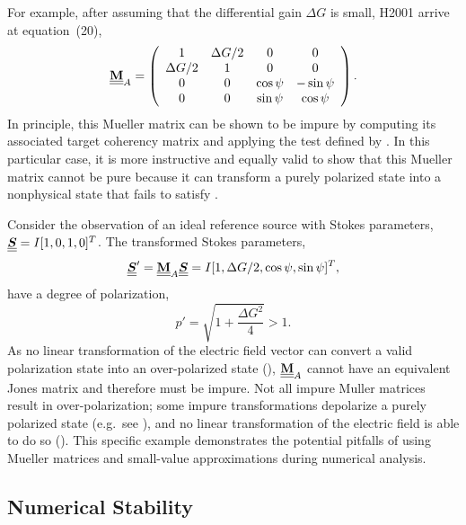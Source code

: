 For example, after assuming that the differential gain $\Delta G$ is small,
H2001 arrive at equation~(20),
\begin{equation}
\label{eqn:hpn+01_eqn20}
{\underline{\underline{{\bf M}}}}_A=\left( \begin{array}{cccc}
1 & \Delta G/2 & 0 & 0 \\
\Delta G/2 & 1 & 0 & 0 \\
0 & 0 & \cos\psi & -\sin\psi \\
0 & 0 & \sin\psi & \cos\psi
\end{array} \right).
\end{equation}
%
In principle, this Mueller matrix can be shown to be impure
by computing its associated target coherency matrix and applying
the test defined by .
%
In this particular case, it is more instructive and equally valid to show that this Mueller matrix cannot be pure because it can transform a purely polarized state into a nonphysical state that fails to satisfy .

Consider the observation of an ideal reference source  with Stokes parameters,
$\underline{\underline{\mbox{\boldmath $S$}}}=I[1,0,1,0]^T$.
%
The transformed Stokes parameters,
\begin{equation}
\underline{\underline{\mbox{\boldmath $S$}}}'={\underline{\underline{{\bf M}}}}_A \underline{\underline{\mbox{\boldmath $S$}}} = I[1,\Delta G/2,\cos\psi,\sin\psi]^T,
\end{equation}
have a degree of polarization,
%
\begin{equation}
p' = \sqrt{1+\frac{\Delta G^2}{4}} > 1.
\end{equation}
%
As no linear transformation of the electric field vector can convert a valid polarization state into an over-polarized state (), ${\underline{\underline{{\bf M}}}}_A$ cannot have an equivalent Jones matrix and therefore must be impure.
%
Not all impure Muller matrices result in over-polarization; some impure transformations depolarize a purely polarized state (e.g.\ see ), and no linear transformation of the electric field is able to do so ().
%
This specific example demonstrates the potential pitfalls of using Mueller matrices and small-value approximations during numerical analysis.

\subsection{Numerical Stability}

